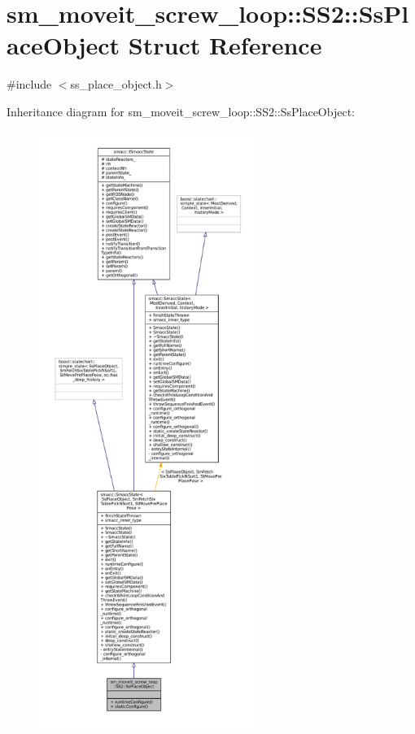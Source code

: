 \hypertarget{structsm__moveit__screw__loop_1_1SS2_1_1SsPlaceObject}{}\section{sm\+\_\+moveit\+\_\+screw\+\_\+loop\+:\+:S\+S2\+:\+:Ss\+Place\+Object Struct Reference}
\label{structsm__moveit__screw__loop_1_1SS2_1_1SsPlaceObject}


{\ttfamily \#include $<$ss\+\_\+place\+\_\+object.\+h$>$}



Inheritance diagram for sm\+\_\+moveit\+\_\+screw\+\_\+loop\+:\+:S\+S2\+:\+:Ss\+Place\+Object\+:
\nopagebreak
\begin{figure}[H]
\begin{center}
\leavevmode
\includegraphics[height=550pt]{structsm__moveit__screw__loop_1_1SS2_1_1SsPlaceObject__inherit__graph}
\end{center}
\end{figure}


